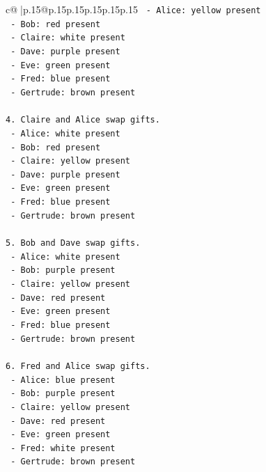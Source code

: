 \documentclass{article}
\begin{document}
{\begin{supertabular}{c@{$\;$}|p{.15\linewidth}@{}p{.15\linewidth}p{.15\linewidth}p{.15\linewidth}p{.15\linewidth}p{.15\linewidth}}
{{{\texttt{   {-} Alice: yellow present} \\
\texttt{   {-} Bob: red present} \\
\texttt{   {-} Claire: white present} \\
\texttt{   {-} Dave: purple present} \\
\texttt{   {-} Eve: green present} \\
\texttt{   {-} Fred: blue present} \\
\texttt{   {-} Gertrude: brown present} \\
\\ 
\texttt{4. Claire and Alice swap gifts.} \\
\texttt{   {-} Alice: white present} \\
\texttt{   {-} Bob: red present} \\
\texttt{   {-} Claire: yellow present} \\
\texttt{   {-} Dave: purple present} \\
\texttt{   {-} Eve: green present} \\
\texttt{   {-} Fred: blue present} \\
\texttt{   {-} Gertrude: brown present} \\
\\ 
\texttt{5. Bob and Dave swap gifts.} \\
\texttt{   {-} Alice: white present} \\
\texttt{   {-} Bob: purple present} \\
\texttt{   {-} Claire: yellow present} \\
\texttt{   {-} Dave: red present} \\
\texttt{   {-} Eve: green present} \\
\texttt{   {-} Fred: blue present} \\
\texttt{   {-} Gertrude: brown present} \\
\\ 
\texttt{6. Fred and Alice swap gifts.} \\
\texttt{   {-} Alice: blue present} \\
\texttt{   {-} Bob: purple present} \\
\texttt{   {-} Claire: yellow present} \\
\texttt{   {-} Dave: red present} \\
\texttt{   {-} Eve: green present} \\
\texttt{   {-} Fred: white present} \\
\texttt{   {-} Gertrude: brown present} \\
}}}
\end{supertabular}}
\end{document}
